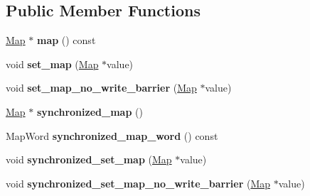 \subsection*{Public Member Functions}
\begin{DoxyCompactItemize}
\item 
\hyperlink{classv8_1_1internal_1_1_map}{Map} $\ast$ {\bfseries map} () const \hypertarget{classv8_1_1internal_1_1_heap_object_a5f10811ccf4f07be8349eba2f7265d9c}{}\label{classv8_1_1internal_1_1_heap_object_a5f10811ccf4f07be8349eba2f7265d9c}

\item 
void {\bfseries set\+\_\+map} (\hyperlink{classv8_1_1internal_1_1_map}{Map} $\ast$value)\hypertarget{classv8_1_1internal_1_1_heap_object_a238c1d2f833601734b2fb953fa8b4e0b}{}\label{classv8_1_1internal_1_1_heap_object_a238c1d2f833601734b2fb953fa8b4e0b}

\item 
void {\bfseries set\+\_\+map\+\_\+no\+\_\+write\+\_\+barrier} (\hyperlink{classv8_1_1internal_1_1_map}{Map} $\ast$value)\hypertarget{classv8_1_1internal_1_1_heap_object_a09b55ec859f14abfa17b1112bf135632}{}\label{classv8_1_1internal_1_1_heap_object_a09b55ec859f14abfa17b1112bf135632}

\item 
\hyperlink{classv8_1_1internal_1_1_map}{Map} $\ast$ {\bfseries synchronized\+\_\+map} ()\hypertarget{classv8_1_1internal_1_1_heap_object_aec25690bd5b29e515371699b01256c9a}{}\label{classv8_1_1internal_1_1_heap_object_aec25690bd5b29e515371699b01256c9a}

\item 
Map\+Word {\bfseries synchronized\+\_\+map\+\_\+word} () const \hypertarget{classv8_1_1internal_1_1_heap_object_a39c7cb7df22fd6bdfb33e26266620ed7}{}\label{classv8_1_1internal_1_1_heap_object_a39c7cb7df22fd6bdfb33e26266620ed7}

\item 
void {\bfseries synchronized\+\_\+set\+\_\+map} (\hyperlink{classv8_1_1internal_1_1_map}{Map} $\ast$value)\hypertarget{classv8_1_1internal_1_1_heap_object_aca15bae864522209d425f12d71d1c4dd}{}\label{classv8_1_1internal_1_1_heap_object_aca15bae864522209d425f12d71d1c4dd}

\item 
void {\bfseries synchronized\+\_\+set\+\_\+map\+\_\+no\+\_\+write\+\_\+barrier} (\hyperlink{classv8_1_1internal_1_1_map}{Map} $\ast$value)\hypertarget{classv8_1_1internal_1_1_heap_object_a03f22b388bd784a49f4938ce1d944fd7}{}\label{classv8_1_1internal_1_1_heap_object_a03f22b388bd784a49f4938ce1d944fd7}


\end{DoxyCompactItemize}
